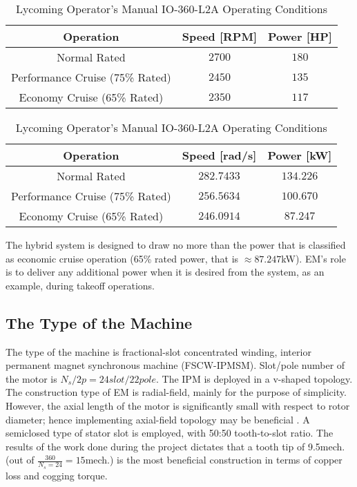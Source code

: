 \documentclass[11pt, a4paper]{article}
\begin{document}
	
\begin{table}[h]
	\begin{subtable}[h]{1.00\textwidth}
		\begin{center}
			\begin{tabular}{c|c|c}
				Operation &  Speed [RPM] & Power [HP] \\
				\hline
				Normal Rated & $2700$ & $180$ \\
				Performance Cruise (75\% Rated) & $2450$ & $135$ \\ 
				Economy Cruise (65\% Rated) & $2350$ & $117$
			\end{tabular}
		\end{center}
		\caption{as given in Operator's Manual}
	\end{subtable}
	\begin{subtable}[h]{1.00\textwidth}
		\begin{center}
			\begin{tabular}{c|c|c}
				Operation &  Speed [rad/s] & Power [kW] \\
				\hline
				Normal Rated & $282.7433$ & $134.226$ \\
				Performance Cruise (75\% Rated) & $256.5634$ & $100.670$ \\ 
				Economy Cruise (65\% Rated) & $246.0914$ & $87.247$
			\end{tabular}
		\end{center}
		\caption{in SI units}
	\end{subtable}
	\caption{Lycoming Operator's Manual IO-360-L2A Operating Conditions}
	\label{fig:ICEoperations}
\end{table}

	The hybrid system is designed to draw no more than the power that is classified as economic cruise operation (65\% rated power, that is $\approx87.247$kW). EM's role is to deliver any additional power when it is desired from the system, as an example, during takeoff operations.
	

	\subsection{The Type of the Machine}
	The type of the machine is fractional-slot concentrated winding, interior permanent magnet synchronous machine (FSCW-IPMSM). Slot/pole number of the motor is $N_s/2p=24slot/22pole$. The IPM is deployed in a v-shaped topology. The construction type of EM is radial-field, mainly for the purpose of simplicity. However, the axial length of the motor is significantly small with respect to rotor diameter; hence implementing axial-field topology may be beneficial \cite{PMMforTA}. A semiclosed type of stator slot is employed, with 50:50 tooth-to-slot ratio.
	The results of the work done during the project dictates that a tooth tip of 9.5\textdegree mech. (out of $\frac{360}{N_s=24}=15$\textdegree mech.) is the most beneficial construction in terms of copper loss and cogging torque.
\end{document}

